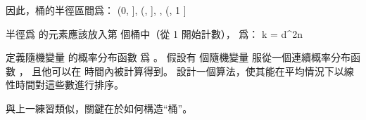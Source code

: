 因此，桶的半徑區間爲：
\startformula
\left(0,  \right],
   \left(, \right], \cdots,
   \left(, 1 \right]
\stopformula

半徑爲  的元素應該放入第  個桶中（從 1 開始計數），  爲：
\startformula
k = \lceil d^2n \rceil
\stopformula
\stopANSWER

\startEXERCISE\DIFFICULT
定義隨機變量  的{\EMP 概率分布函數}  爲 。
假設有  個隨機變量  服從一個連續概率分布函數 ，
且他可以在  時間內被計算得到。
設計一個算法，使其能在平均情況下以線性時間對這些數進行排序。
\stopEXERCISE

\startANSWER
與上一練習類似，關鍵在於如何構造“桶”。
\stopANSWER

\stopsection
